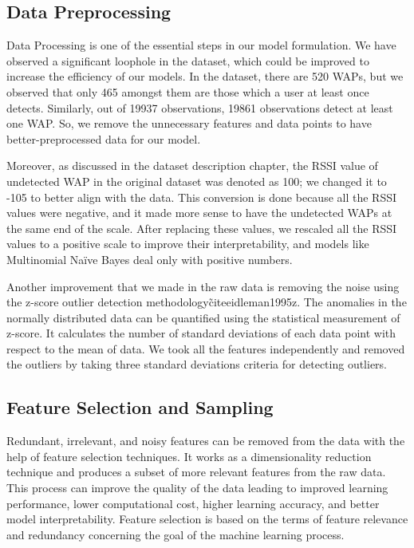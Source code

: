 \documentclass[a4paper,singleside,12pt]{report} %
\begin{document}
			\subsection{Data Preprocessing}

			Data Processing is one of the essential steps in our model formulation. We have observed a significant loophole in the dataset, which could be improved to increase the efficiency of our models. 
			In the dataset, there are 520 WAPs, but we observed that only 465 amongst them are those which a user at least once detects.
			Similarly, out of 19937 observations, 19861 observations detect at least one WAP. 
			So, we remove the unnecessary features and data points to have better-preprocessed data for our model.
			
			Moreover, as discussed in the dataset description chapter, the RSSI value of undetected WAP in the original dataset was denoted as 100; we changed it to -105 to better align with the data. 
			This conversion is done because all the RSSI values were negative, and it made more sense to have the undetected WAPs at the same end of the scale. 
			After replacing these values, we rescaled all the RSSI values to a positive scale to improve their interpretability, and models like Multinomial Naïve Bayes deal only with positive numbers.

			Another improvement that we made in the raw data is removing the noise using the z-score outlier detection methodology\~cite{eidleman1995z}. 
			The anomalies in the normally distributed data can be quantified using the statistical measurement of z-score.
			It calculates the number of standard deviations of each data point with respect to the mean of data.
			We took all the features independently and removed the outliers by taking three standard deviations criteria for detecting outliers. 

			\subsection{Feature Selection and Sampling}

			Redundant, irrelevant, and noisy features can be removed from the data with the help of feature selection techniques. It works as a dimensionality reduction technique and produces a subset of more relevant features from the raw data. 
			This process can improve the quality of the data leading to improved learning performance, lower computational cost, higher learning accuracy, and better model interpretability.
			Feature selection is based on the terms of feature relevance and redundancy concerning the goal of the machine learning process.
			
\end{document}
